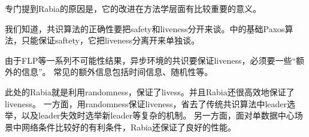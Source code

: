 专门提到Rabia的原因是，它的改进在方法学层面有比较重要的意义。

我们知道，共识算法的正确性要把safety和liveness分开来谈。\cite{Lamport01}中的基础Paxos算法，只能保证saftety，它把liveness分离开来单独谈。

由于FLP等一系列不可能性结果，异步环境的共识要保证liveness，必须要一些“额外的信息”。
常见的额外信息包括时间信息、随机性等。

此处的Rabia就是利用randomness，保证了livess。并且Rabia还很高效地保证了liveness。
一方面，用randomness保证liveness，省去了传统共识算法中leader选举，以及leader失效时选举新leader等复杂的机制。
另一方面，面对单数据中心场景中网络条件比较好的有利条件，Rabia还保证了良好的性能。

